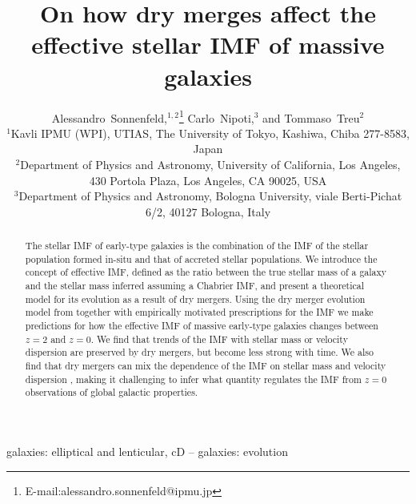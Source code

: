 \documentclass[usenatbib, letters]{mnras}
\begin{document}
\title{On how dry merges affect the effective stellar IMF of massive galaxies}
\author[Sonnenfeld et al.]{
Alessandro~Sonnenfeld,$^{1,2}$\thanks{E-mail:alessandro.sonnenfeld@ipmu.jp}
Carlo~Nipoti,$^{3}$
and Tommaso~Treu$^{2}$
\\
$^{1}$Kavli IPMU (WPI), UTIAS, The University of Tokyo, Kashiwa, Chiba 277-8583, Japan \\
$^{2}$Department of Physics and Astronomy, University of California, Los Angeles, 430 Portola Plaza, Los Angeles, CA 90025, USA \\
$^{3}$Department of Physics and Astronomy, Bologna University, viale Berti-Pichat 6/2, 40127 Bologna, Italy
}

\maketitle

\begin{abstract}
The stellar IMF of early-type galaxies is the combination of the IMF of the stellar population formed in-situ and that of accreted stellar populations.
We introduce the concept of effective IMF, defined as the ratio between the true stellar mass of a galaxy and the stellar mass inferred assuming a Chabrier IMF, and present a theoretical model for its evolution as a result of dry mergers.
Using the dry merger evolution model from \citet{Nip++12} together with empirically motivated prescriptions for the IMF we make predictions for how the effective IMF of massive early-type galaxies changes between $z=2$ and $z=0$.
We find that trends of the IMF with stellar mass or velocity dispersion are preserved by dry mergers, but become less strong with time.
We also find that dry mergers can mix the dependence of the IMF on stellar mass and velocity dispersion
, making it challenging to infer what quantity regulates the IMF from $z=0$ observations of global galactic properties.
\end{abstract}

\begin{keywords}
   galaxies: elliptical and lenticular, cD -- galaxies: evolution
\end{keywords}

\end{document}
